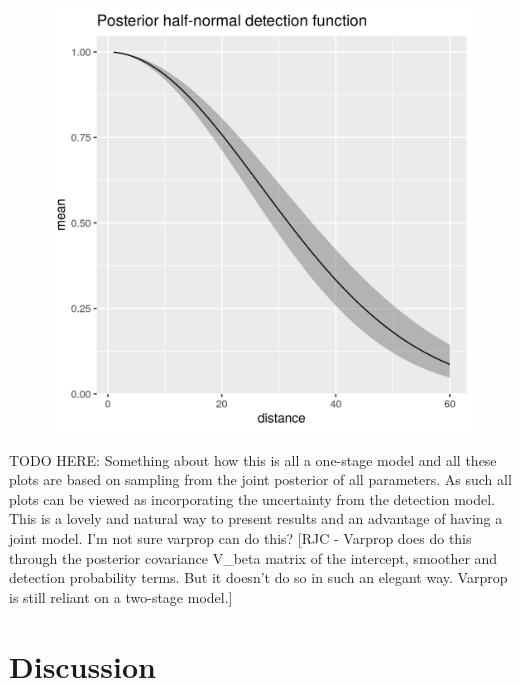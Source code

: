 \documentclass[preprint,12pt]{elsarticle}
\begin{document}
\begin{figure}
	\includegraphics[scale=0.6]{figures/halfnormal.png}
\end{figure}

\bigskip

TODO HERE:  Something about how this is all a one-stage model and all these plots are based on sampling from the joint posterior of all parameters.  As such all plots can be viewed as incorporating the uncertainty from the detection model.  This is a lovely and natural way to present results and an advantage of having a joint model.  I'm not sure varprop can do this? [RJC - Varprop does do this through the posterior covariance V_beta matrix of the intercept, smoother and detection probability terms. But it doesn't do so in such an elegant way. Varprop is still reliant on a two-stage model.]

\newpage

\section*{Discussion}
\end{document}
